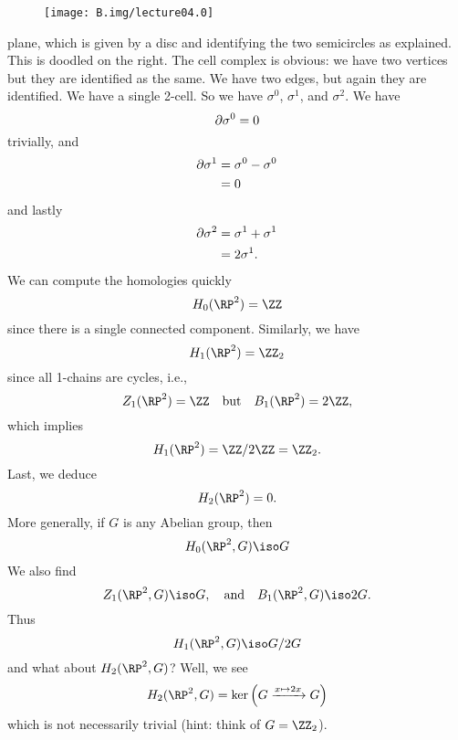 \begin{wrapfigure}{r}{6pc}
  \vspace{-12pt}
  \centering
  \texttt{[image: B.img/lecture04.0]}
\end{wrapfigure}
\noindent\ignorespaces %
plane,
which is given by a disc and identifying the two semicircles as
explained. 
This is doodled on the right.
The cell complex is obvious: we have two vertices but they are
identified as the same. We have two edges, but again they are
identified. We have a single 2-cell. So we have $\sigma^0$,
$\sigma^1$, and $\sigma^2$. We have
\begin{equation}
\partial\sigma^0=0
\end{equation}
trivially, and
\begin{equation}
\begin{split}
\partial\sigma^1
&=\sigma^0-\sigma^0\\
&=0
\end{split}
\end{equation}
and lastly
\begin{equation}
\begin{split}
\partial\sigma^2
&=\sigma^1+\sigma^1\\
&=2\sigma^1.
\end{split}
\end{equation}
We can compute the homologies quickly
\begin{equation}
H_{0}(\RP^2)=\ZZ
\end{equation}
since there is a single connected component. Similarly, we have
\begin{equation}
H_{1}(\RP^{2})=\ZZ_{2}
\end{equation}
since all 1-chains are cycles, i.e.,
\begin{equation}
Z_{1}(\RP^2)=\ZZ\quad\mbox{but}\quad B_{1}(\RP^2)=2\ZZ,
\end{equation}
which implies
\begin{equation}
H_{1}(\RP^2)=\ZZ/2\ZZ=\ZZ_{2}.
\end{equation}
Last, we deduce
\begin{equation}
H_{2}(\RP^2)=0.
\end{equation}
More generally, if $G$ is any Abelian group, then
\begin{equation}
H_{0}(\RP^2,G)\iso G
\end{equation}
We also find
\begin{equation}
Z_{1}(\RP^{2},G)\iso G,\quad\mbox{and}\quad
B_{1}(\RP^{2},G)\iso 2G.
\end{equation}
Thus
\begin{equation}
H_{1}(\RP^2,G)\iso G/2G
\end{equation}
and what about $H_{2}(\RP^2,G)$? Well, we see
\begin{equation}
H_{2}(\RP^2,G)=\ker\left(G\xrightarrow{x\mapsto 2x}G\right)
\end{equation}
which is not necessarily trivial (hint: think of $G=\ZZ_{2}$).
